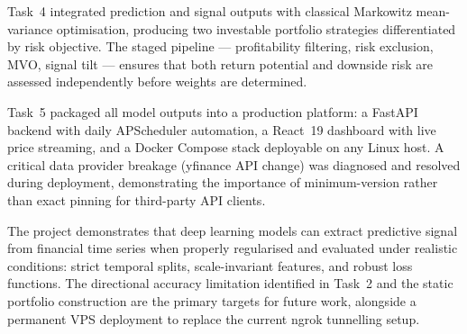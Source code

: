 \documentclass[12pt, a4paper]{article}
\begin{document}
Task~4 integrated prediction and signal outputs with classical Markowitz
mean-variance optimisation, producing two investable portfolio strategies
differentiated by risk objective. The
staged pipeline --- profitability filtering, risk exclusion, MVO, signal
tilt --- ensures that both return potential and downside risk are assessed
independently before weights are determined.

Task~5 packaged all model outputs into a production platform: a FastAPI backend
with daily APScheduler automation, a React~19 dashboard with live price streaming,
and a Docker Compose stack deployable on any Linux host. A critical data
provider breakage (yfinance API change) was diagnosed and resolved during
deployment, demonstrating the importance of minimum-version rather than exact
pinning for third-party API clients.

The project demonstrates that deep learning models can extract
predictive signal from financial time series when properly regularised and
evaluated under realistic conditions: strict temporal splits, scale-invariant
features, and robust loss functions. The directional accuracy limitation
identified in Task~2 and the static portfolio construction are the primary
targets for future work, alongside a permanent VPS deployment to replace
the current ngrok tunnelling setup.
\end{document}
